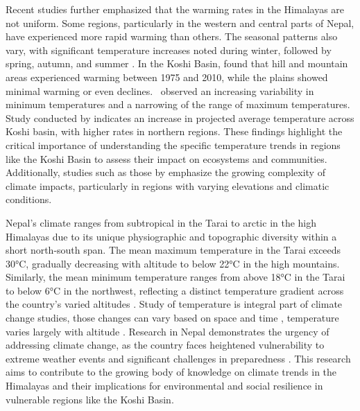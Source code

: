 Recent studies further emphasized that the warming rates in the Himalayas are not uniform. Some regions, particularly in the western and central parts of Nepal, have experienced more rapid warming than others. The seasonal patterns also vary, with significant temperature increases noted during winter, followed by spring, autumn, and summer \parencite{agarwal_analysis_2016}. In the Koshi Basin, \textcite{shrestha_observed_2017} found that hill and mountain areas experienced warming between 1975 and 2010, while the plains showed minimal warming or even declines.~\textcite{bastakoti_agriculture_2017} observed an increasing variability in minimum temperatures and a narrowing of the range of maximum temperatures. Study conducted by \textcite{bajracharya_future_2023} indicates an increase in projected average temperature across Koshi basin, with higher rates in northern regions. These findings highlight the critical importance of understanding the specific temperature trends in regions like the Koshi Basin to assess their impact on ecosystems and communities. Additionally, studies such as those by \textcite{poudel_spatiotemporal_2020} emphasize the growing complexity of climate impacts, particularly in regions with varying elevations and climatic conditions. 


Nepal's climate ranges from subtropical in the Tarai to arctic in the high Himalayas due to its unique physiographic and topographic diversity within a short north-south span. The mean maximum temperature in the Tarai exceeds 30°C, gradually decreasing with altitude to below 22°C in the high mountains. Similarly, the mean minimum temperature ranges from above 18°C in the Tarai to below 6°C in the northwest, reflecting a distinct temperature gradient across the country's varied altitudes \parencite{marahatta_temporal_2009}. Study of temperature is integral part of climate change studies, those changes can vary based on space and time \parencite{bajracharya_future_2023}, temperature varies largely with altitude \parencite{chand_trend_2019}. Research in Nepal demonstrates the urgency of addressing climate change, as the country faces heightened vulnerability to extreme weather events and significant challenges in preparedness \parencite{chapagain_unpacking_2021}. This research aims to contribute to the growing body of knowledge on climate trends in the Himalayas and their implications for environmental and social resilience in vulnerable regions like the Koshi Basin.

